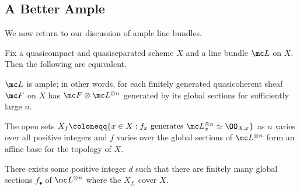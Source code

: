 \documentclass[../notes.tex]{subfiles}
\begin{document}
\subsection{A Better Ample}
We now return to our discussion of ample line bundles.
\begin{proposition}
	Fix a quasicompact and quasiseparated scheme $X$ and a line bundle $\mc L$ on $X$. Then the following are equivalent.
	\begin{listalph}
		\item $\mc L$ is ample; in other words, for each finitely generated quasicoherent sheaf $\mc F$ on $X$ has $\mc F\otimes\mc L^{\otimes n}$ generated by its global sections for sufficiently large $n$.
		\item The open sets $X_f\coloneqq\{x\in X:f_x\text{ generates }\mc L_x^{\otimes n}\simeq\OO_{X,x}\}$ as $n$ varies over all positive integers and $f$ varies over the global sections of $\mc L^{\otimes n}$ form an affine base for the topology of $X$.
		\item There exists some positive integer $d$ such that there are finitely many global sections $f_\bullet$ of $\mc L^{\otimes n}$ where the $X_{f_i}$ cover $X$.
	\end{listalph}
\end{proposition}
\end{document}
